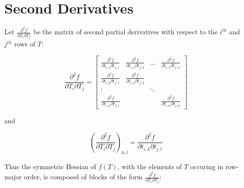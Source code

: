 \documentclass{report}
\begin{document}
\section{Second Derivatives}

Let $\frac{\partial^2 f}{\partial T_i \partial T_j}$ be the matrix of second partial derivatives with respect to the $i^{th}$ and $j^{th}$ rows of $T$:

\begin{equation}
\frac{\partial^2 f}{\partial T_i \partial T_j} = 
\left[ \begin{array}{cccc}
\frac{\partial^2 f}{\partial t_{i,1} \partial t_{j,1}} &
\frac{\partial^2 f}{\partial t_{i,1} \partial t_{j,2}} &
\ldots &
\frac{\partial^2 f}{\partial t_{i,1} \partial t_{j,n}} \\
\frac{\partial^2 f}{\partial t_{i,2} \partial t_{j,1}} &
\frac{\partial^2 f}{\partial t_{i,2} \partial t_{j,2}} \\
\vdots & & \ddots \\
\frac{\partial^2 f}{\partial t_{i,n} \partial t_{j,1}} & & &
\frac{\partial^2 f}{\partial t_{i,n} \partial t_{j,n}}
\end{array} \right]
\end{equation}

and

\begin{equation}
\label{dsecelem}
\left(\frac{\partial^2 f}{\partial T_i \partial T_j}\right)_{k,l} = 
\frac{\partial^2 f}{\partial t_{i,k} \partial t_{j,l}}
\end{equation}

Thus the symmetric Hessian of $f(T)$, with the elements of $T$ occuring in row-major order, is composed of blocks of the form $\frac{\partial^2 f}{\partial T_i \partial T_j}$:
\end{document}
